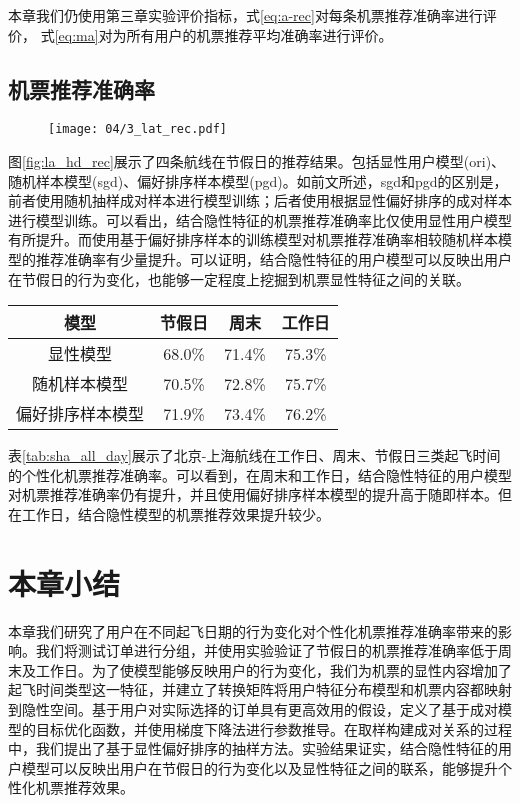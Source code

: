 本章我们仍使用第三章实验评价指标，式\ref{eq:a-rec}对每条机票推荐准确率进行评价，
式\ref{eq:ma}对为所有用户的机票推荐平均准确率进行评价。

\subsection{机票推荐准确率}

\begin{figure}
 \centering
 \texttt{[image: 04/3\_lat\_rec.pdf]}
\end{figure}

图\ref{fig:la_hd_rec}展示了四条航线在节假日的推荐结果。包括显性用户模型(ori)、随机样本模型(sgd)、偏好排序样本模型(pgd)。如前文所述，sgd和pgd的区别是，前者使用随机抽样成对样本进行模型训练；后者使用根据显性偏好排序的成对样本进行模型训练。可以看出，结合隐性特征的机票推荐准确率比仅使用显性用户模型有所提升。而使用基于偏好排序样本的训练模型对机票推荐准确率相较随机样本模型的推荐准确率有少量提升。可以证明，结合隐性特征的用户模型可以反映出用户在节假日的行为变化，也能够一定程度上挖掘到机票显性特征之间的关联。


\begin{table}[!h]
  \centering
  \begin{tabular}{|c|c|c|c|} \hline 
模型 & 节假日 & 周末 & 工作日 \\ \hline
显性模型 & 68.0\% & 71.4\% & 75.3\% \\ \hline
随机样本模型 & 70.5\% & 72.8\% & 75.7\% \\ \hline
偏好排序样本模型 & 71.9\% & 73.4\% & 76.2\% \\ \hline
  \end{tabular}
\end{table}

表\ref{tab:sha_all_day}展示了北京-上海航线在工作日、周末、节假日三类起飞时间的个性化机票推荐准确率。可以看到，在周末和工作日，结合隐性特征的用户模型对机票推荐准确率仍有提升，并且使用偏好排序样本模型的提升高于随即样本。但在工作日，结合隐性模型的机票推荐效果提升较少。

\section{本章小结}

本章我们研究了用户在不同起飞日期的行为变化对个性化机票推荐准确率带来的影响。我们将测试订单进行分组，并使用实验验证了节假日的机票推荐准确率低于周末及工作日。为了使模型能够反映用户的行为变化，我们为机票的显性内容增加了起飞时间类型这一特征，并建立了转换矩阵将用户特征分布模型和机票内容都映射到隐性空间。基于用户对实际选择的订单具有更高效用的假设，定义了基于成对模型的目标优化函数，并使用梯度下降法进行参数推导。在取样构建成对关系的过程中，我们提出了基于显性偏好排序的抽样方法。实验结果证实，结合隐性特征的用户模型可以反映出用户在节假日的行为变化以及显性特征之间的联系，能够提升个性化机票推荐效果。